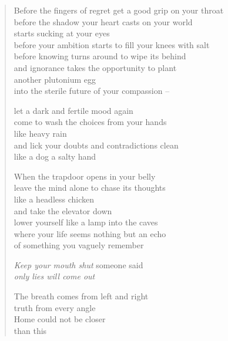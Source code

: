 \begin{verse}

Before the fingers of regret get a good grip on your throat\\
before the shadow your heart casts on your world\\
starts sucking at your eyes\\
before your ambition starts to fill your knees with salt\\
before knowing turns around to wipe its behind\\
and ignorance takes the opportunity to plant\\
another plutonium egg\\
into the sterile future of your compassion --

let a dark and fertile mood again\\
come to wash the choices from your hands\\
like heavy rain\\
and lick your doubts and contradictions clean\\
like a dog a salty hand

When the trapdoor opens in your belly\\
leave the mind alone to chase its thoughts\\
like a headless chicken\\
and take the elevator down\\
lower yourself like a lamp into the caves\\
where your life seems nothing but an echo\\
of something you vaguely remember

\emph{Keep your mouth shut} someone said\\
\emph{only lies will come out}

The breath comes from left and right\\
truth from every angle\\
Home could not be closer\\
than this

\end{verse}

